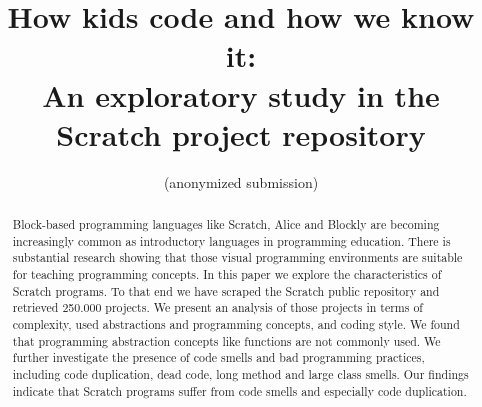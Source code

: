 \documentclass{sig-alternate}
\begin{document}
%

\title{How kids code and how we know it:\\An exploratory study in the Scratch project repository }

\author{
\alignauthor
(anonymized submission)
}


\maketitle
\begin{abstract}
Block-based programming languages like Scratch, Alice and Blockly are becoming increasingly common as introductory languages in programming education. There is substantial research showing that those visual programming environments are suitable for teaching programming concepts. In this paper we explore the characteristics of Scratch programs. To that end we have scraped the Scratch public repository and retrieved 250.000 projects. We present an analysis of those projects in terms of complexity, used abstractions and programming concepts, and coding style. We found that programming abstraction concepts like functions are not commonly used. We further investigate the presence of code smells and bad programming practices, including code duplication, dead code, long method and large class smells. Our findings indicate that Scratch programs suffer from code smells and especially code duplication.
\end{abstract}
\end{document}
